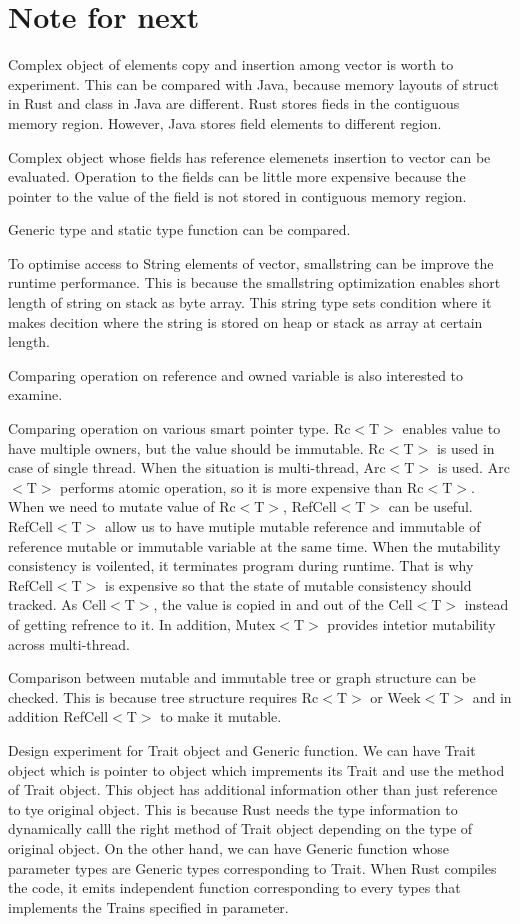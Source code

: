 \section{Note for next}
\label{sec:history}
Complex object of elements copy and insertion among vector is worth to experiment. This can be compared with Java,
because memory layouts of struct in Rust and class in Java are different. Rust stores fieds in the contiguous memory region. 
However, Java stores field elements to different region.

Complex object whose fields has reference elemenets insertion to vector can be evaluated. Operation to the fields can be little 
more expensive because the pointer to the value of the field is not stored in contiguous memory region.

Generic type and static type function can be compared. 

To optimise access to String elements of vector, smallstring can be improve the runtime performance. 
This is because the smallstring optimization enables short length of string on stack as byte array. 
This string type sets condition where it makes decition where the string is stored on heap or stack as array at certain length.

Comparing operation on reference and owned variable is also interested to examine.

Comparing operation on various smart pointer type. 
Rc$<$T$>$ enables value to have multiple owners, but the value should be immutable. Rc$<$T$>$ is used in case of single thread. 
When the situation is multi-thread, Arc$<$T$>$ is used. Arc$<$T$>$ performs atomic operation, so it is more expensive than Rc$<$T$>$. 
When we need to mutate value of Rc$<$T$>$, RefCell$<$T$>$ can be useful. RefCell$<$T$>$ allow us to have mutiple mutable reference and immutable
of reference mutable or immutable variable at the same time. When the mutability consistency is voilented, it terminates program during runtime. 
That is why RefCell$<$T$>$ is expensive so that the state of mutable consistency should tracked. 
As Cell$<$T$>$, the value is copied in and out of the Cell$<$T$>$ instead of getting refrence to it. 
In addition, Mutex$<$T$>$ provides intetior mutability across multi-thread.

Comparison between mutable and immutable tree or graph structure can be checked. 
This is because tree structure requires Rc$<$T$>$ or Week$<$T$>$ and in addition RefCell$<$T$>$ to make it mutable.

Design experiment for Trait object and Generic function. 
We can have Trait object which is pointer to object which imprements its Trait and use the method of Trait object.
This object has additional information other than just reference to tye original object. 
This is because Rust needs the type information to dynamically calll the right method of Trait object depending on the type of 
original object.
On the other hand, we can have Generic function whose parameter types are Generic types corresponding to Trait. 
When Rust compiles the code, it emits independent function corresponding to every types that implements the Trains specified in parameter.

